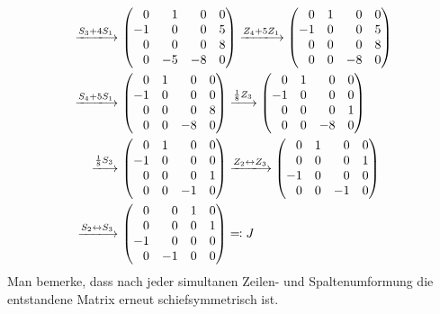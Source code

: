 \begin{align*}
  \xlongrightarrow{S_3 + 4 S_1}&\,
  \begin{pmatrix*}[r]
     0  &  1  &  0  & 0 \\
    -1  &  0  &  0  & 5 \\
     0  &  0  &  0  & 8 \\
     0  & -5  & -8  & 0
  \end{pmatrix*}
  \xlongrightarrow{Z_4 + 5 Z_1}
  \begin{pmatrix*}[r]
     0  & 1 &  0  & 0 \\
    -1  & 0 &  0  & 5 \\
     0  & 0 &  0  & 8 \\
     0  & 0 & -8  & 0
  \end{pmatrix*}
  \\
  \xlongrightarrow{S_4 + 5 S_1}&\,
  \begin{pmatrix*}[r]
     0  & 1 &  0  & 0 \\
    -1  & 0 &  0  & 0 \\
     0  & 0 &  0  & 8 \\
     0  & 0 & -8  & 0
  \end{pmatrix*}
  \xlongrightarrow{\frac{1}{8} Z_3}
  \begin{pmatrix*}[r]
     0  & 1 &  0  & 0 \\
    -1  & 0 &  0  & 0 \\
     0  & 0 &  0  & 1 \\
     0  & 0 & -8  & 0
  \end{pmatrix*}
  \\
  \xlongrightarrow{\frac{1}{8} S_3}&\,
  \begin{pmatrix*}[r]
     0  & 1 &  0  & 0 \\
    -1  & 0 &  0  & 0 \\
     0  & 0 &  0  & 1 \\
     0  & 0 & -1  & 0
  \end{pmatrix*}
  \xlongrightarrow{Z_2 \leftrightarrow Z_3}
  \begin{pmatrix*}[r]
     0  & 1 &  0  & 0 \\
     0  & 0 &  0  & 1 \\
    -1  & 0 &  0  & 0 \\
     0  & 0 & -1  & 0
  \end{pmatrix*}
  \\
  \xlongrightarrow{S_2 \leftrightarrow S_3}&\,
  \begin{pmatrix*}[r]
     0  &  0  & 1 & 0 \\
     0  &  0  & 0 & 1 \\
    -1  &  0  & 0 & 0 \\
     0  & -1  & 0 & 0
  \end{pmatrix*}
  \eqqcolon
  J
\end{align*}
\endgroup
Man bemerke, dass nach jeder simultanen Zeilen- und Spaltenumformung die entstandene Matrix erneut schiefsymmetrisch ist.

